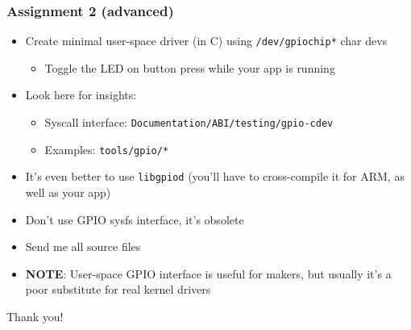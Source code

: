 \documentclass[aspectratio=169,usenames,dvipsnames]{beamer}
\begin{document}
\begin{frame}
  \frametitle{Assignment 2 (advanced)}
  \begin{itemize}
    \item Create minimal user-space driver (in C) using
          \texttt{/dev/gpiochip*} char devs
      \begin{itemize}
        \item Toggle the LED on button press while your app is running
      \end{itemize}
    \item Look here for insights:
      \begin{itemize}
        \item Syscall interface: \texttt{Documentation/ABI/testing/gpio-cdev}
        \item Examples: \texttt{tools/gpio/*}
      \end{itemize}
    \item It's even better to use \texttt{libgpiod} (you'll have to
          cross-compile it for ARM, as well as your app)
    \item Don't use GPIO sysfs interface, it's obsolete
    \item Send me all source files
    \item \textbf{NOTE}: User-space GPIO interface is useful for makers, but
          usually it's a poor substitute for real kernel drivers
  \end{itemize}
\end{frame}

\begin{frame}[standout]
  Thank you!
\end{frame}
\end{document}
